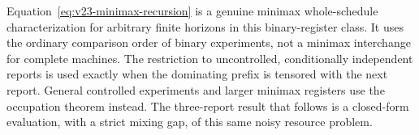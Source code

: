Equation~\eqref{eq:v23-minimax-recursion} is a genuine minimax
whole-schedule characterization for arbitrary finite horizons in this
binary-register class. It uses the ordinary comparison order of binary
experiments, not a minimax interchange for complete machines. The
restriction to uncontrolled, conditionally independent reports is used
exactly when the dominating prefix is tensored with the next report.
General controlled experiments and larger minimax registers use the
occupation theorem instead. The three-report result that follows is a
closed-form evaluation, with a strict mixing gap, of this same noisy
resource problem.
